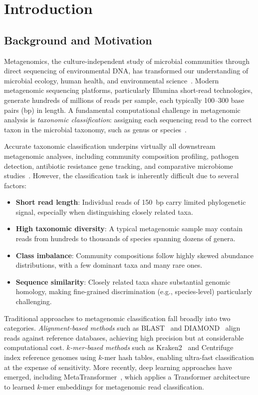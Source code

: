 
\chapter{Introduction}
\label{ch:introduction}

\section{Background and Motivation}
\label{sec:intro-background}

Metagenomics, the culture-independent study of microbial communities through direct sequencing of environmental DNA, has transformed our understanding of microbial ecology, human health, and environmental science~\cite{Quince2017}. 
Modern metagenomic sequencing platforms, particularly Illumina short-read technologies, generate hundreds of millions of reads per sample, each typically 100--300 base pairs (bp) in length. 
A fundamental computational challenge in metagenomic analysis is \emph{taxonomic classification}: assigning each sequencing read to the correct taxon in the microbial taxonomy, such as genus or species~\cite{Ye2019}.

Accurate taxonomic classification underpins virtually all downstream metagenomic analyses, including community composition profiling, pathogen detection, antibiotic resistance gene tracking, and comparative microbiome studies~\cite{Breitwieser2019}. 
However, the classification task is inherently difficult due to several factors:
\begin{itemize}
    \item \textbf{Short read length}: Individual reads of 150~bp carry limited phylogenetic signal, especially when distinguishing closely related taxa.
    \item \textbf{High taxonomic diversity}: A typical metagenomic sample may contain reads from hundreds to thousands of species spanning dozens of genera.
    \item \textbf{Class imbalance}: Community compositions follow highly skewed abundance distributions, with a few dominant taxa and many rare ones.
    \item \textbf{Sequence similarity}: Closely related taxa share substantial genomic homology, making fine-grained discrimination (e.g., species-level) particularly challenging.
\end{itemize}

Traditional approaches to metagenomic classification fall broadly into two categories. 
\emph{Alignment-based methods} such as BLAST~\cite{Altschul1990} and DIAMOND~\cite{Buchfink2015} align reads against reference databases, achieving high precision but at considerable computational cost. 
\emph{$k$-mer-based methods} such as Kraken2~\cite{Wood2019} and Centrifuge~\cite{Kim2016} index reference genomes using $k$-mer hash tables, enabling ultra-fast classification at the expense of sensitivity. 
More recently, deep learning approaches have emerged, including MetaTransformer~\cite{Wichmann2023}, which applies a Transformer architecture to learned $k$-mer embeddings for metagenomic read classification.

